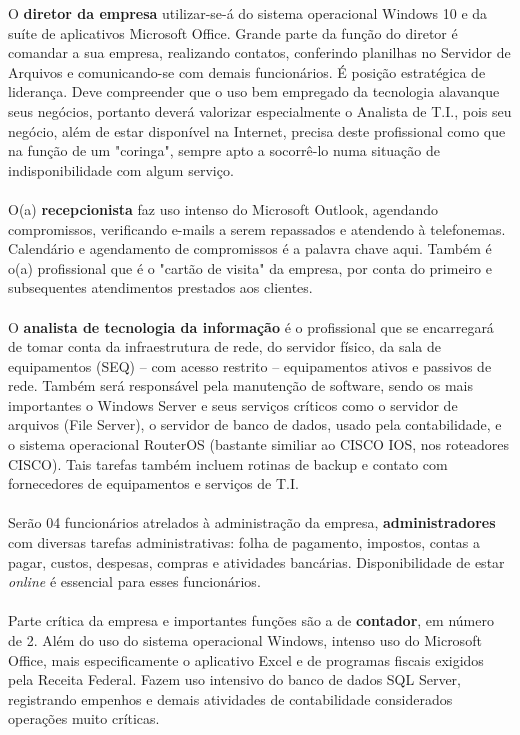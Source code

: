 \documentclass[	DIV=calc,%
							paper=a4,%
							fontsize=12pt,%
							onecolumn]{scrartcl}	 					%
\begin{document}
O \textbf{diretor da empresa} utilizar-se-á do sistema operacional Windows 10 e da suíte de aplicativos Microsoft Office. Grande parte da função do diretor é comandar a sua empresa, realizando contatos, conferindo planilhas no Servidor de Arquivos e comunicando-se com demais funcionários. É posição estratégica de liderança. Deve compreender que o uso bem empregado da tecnologia alavanque seus negócios, portanto deverá valorizar especialmente o Analista de T.I., pois seu negócio, além de estar disponível na Internet, precisa deste profissional como que na função de um "coringa", sempre apto a socorrê-lo numa situação de indisponibilidade com algum serviço.
\\ \\
O(a) \textbf{recepcionista} faz uso intenso do Microsoft Outlook, agendando compromissos, verificando e-mails a serem repassados e atendendo à telefonemas. Calendário e agendamento de compromissos é a palavra chave aqui. Também é o(a) profissional que é o "cartão de visita" da empresa, por conta do primeiro e subsequentes atendimentos prestados aos clientes.
\\ \\
O \textbf{analista de tecnologia da informação} é o profissional que se encarregará de tomar conta da infraestrutura de rede, do servidor físico, da sala de equipamentos (SEQ) -- com acesso restrito -- equipamentos ativos e passivos de rede. Também será responsável pela manutenção de software, sendo os mais importantes o Windows Server e seus serviços críticos como o servidor de arquivos (File Server), o servidor de banco de dados, usado pela contabilidade, e o sistema operacional RouterOS (bastante similiar ao CISCO IOS, nos roteadores CISCO). Tais tarefas também incluem rotinas de backup e contato com fornecedores de equipamentos e serviços de T.I.
\\ \\
Serão 04 funcionários atrelados à administração da empresa, \textbf{administradores} com diversas tarefas administrativas: folha de pagamento, impostos, contas a pagar, custos, despesas, compras e atividades bancárias. Disponibilidade de estar \textit{online} é essencial para esses funcionários.
\\ \\
Parte crítica da empresa e importantes funções são a de \textbf{contador}, em número de 2. Além do uso do sistema operacional Windows, intenso uso do Microsoft Office, mais especificamente o aplicativo Excel e de programas fiscais exigidos pela Receita Federal. Fazem uso intensivo do banco de dados SQL Server, registrando empenhos e demais atividades de contabilidade considerados operações muito críticas.
\end{document}
